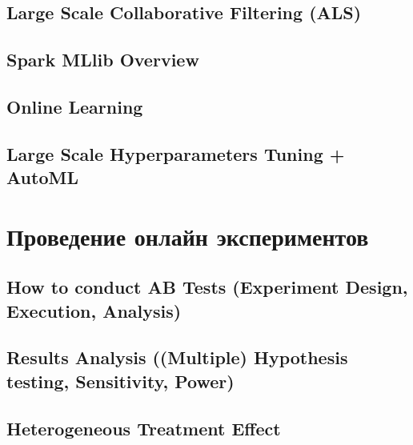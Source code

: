 \documentclass[openany,12pt]{book}
\numberwithin{equation}{section}
\begin{document}
\chapter{Large Scale Collaborative Filtering (ALS)}

\chapter{Spark MLlib Overview}

\chapter{Online Learning}

\chapter{Large Scale Hyperparameters Tuning + AutoML}

\part{Проведение онлайн экспериментов}
\chapter{How to conduct AB Tests (Experiment Design, Execution, Analysis)}

\chapter{Results Analysis ((Multiple) Hypothesis testing, Sensitivity, Power)}

\chapter{Heterogeneous Treatment Effect}

\nocite{*}




\end{document}
